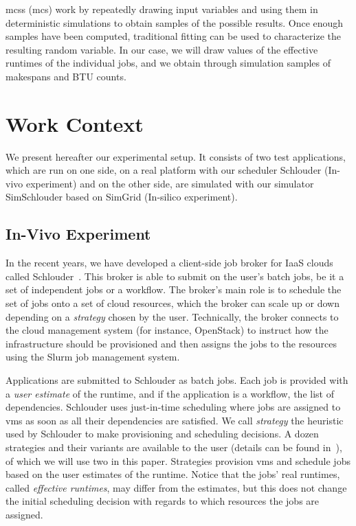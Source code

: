 \documentclass[10pt,conference,compsocconf]{IEEEtran}
\begin{document}
\aclp{mcs} (\acs{mcs})  work by  repeatedly drawing  input variables
and using  them in deterministic simulations  to obtain samples of  the possible
results. Once enough samples have been computed, traditional fitting can be used
to characterize the resulting random variable.  In our case, we will draw values
of  the  effective runtimes  of  the  individual  jobs,  and we  obtain  through
simulation samples of makespans and BTU counts.


\section{Work Context}
\label{sec:work-context}

We  present  hereafter   our  experimental  setup.  It  consists   of  two  test
applications, which are run  on one side, on a real  platform with our scheduler
Schlouder (In-vivo experiment) and on the other side, are simulated with our
simulator SimSchlouder based on SimGrid (In-silico experiment).

 

\subsection{In-Vivo Experiment}
In the recent years, we have developed  a client-side job broker for IaaS clouds
called Schlouder~\cite{Michon17}.  This broker is  able to submit on  the user's
batch jobs, be  it a set of  independent jobs or a workflow.   The broker's main
role is  to schedule the set  of jobs onto a  set of cloud resources,  which the
broker can scale up  or down depending on a \emph{strategy}  chosen by the user.
Technically, the broker  connects to the cloud management  system (for instance,
OpenStack) to  instruct how  the infrastructure should  be provisioned  and then
assigns the jobs to the resources using the Slurm job management system.

Applications are submitted to Schlouder as batch jobs. Each job is provided with
a \emph{user estimate} of the runtime, and if the application is a workflow, the
list  of dependencies.  Schlouder uses  just-in-time scheduling  where jobs  are
assigned to \acp{vm}  as soon as all their dependencies  are satisfied.  We call
\emph{strategy}  the  heuristic  used  by Schlouder  to  make  provisioning  and
scheduling decisions.   A dozen strategies  and their variants are  available to
the user (details can be found in~\cite{GenaudG11}), of which we will use two in
this paper.  Strategies provision \acp{vm} and  schedule jobs based on  the user
estimates  of  the  runtime.  Notice   that  the  jobs'  real  runtimes,  called
\emph{effective  runtimes}, may  differ from  the estimates,  but this  does not
change the initial scheduling decision with  regards to which resources the jobs
are assigned.
\end{document}
